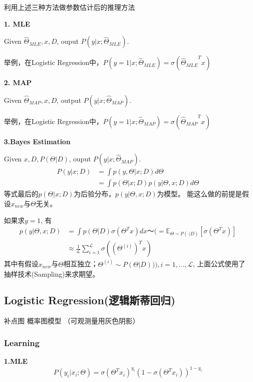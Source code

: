 \documentclass[UTF8]{ctexart}
\begin{document}
利用上述三种方法做参数估计后的推理方法


\textbf{1. MLE}

Given $\hat \Theta_{MLE}, x, D$, ouput $P(y | x; \hat \Theta_{MLE} )$.

举例，在Logistic Regression中，$P(y=1|x;\hat \Theta_{MLE} )=\sigma({\hat \Theta_{MLE} }^T x)$

\textbf{2. MAP}

Given $\hat \Theta_{MAP}, x, D$, output $P(y | x; \hat \Theta_{MAP} )$.

举例，在Logistic Regression中，$P(y=1|x;\hat \Theta_{MAP} )=\sigma({\hat \Theta_{MAP} }^T x)$

\textbf{3.Bayes Estimation}

Given $ x, D, P(\Theta|D)$, ouput $P(y | x; \hat \Theta_{MAP} )$.
\begin{equation*}
    \begin{aligned}
        P(y|x;D) &= \int p(y, \Theta | x;D) d\Theta    \\
        &= \int p(\Theta | x;D)p(y|\Theta,x;D)d\Theta
    \end{aligned}    
\end{equation*}
等式最后的$p(\Theta | x;D)$为后验分布，$p(y|\Theta,x;D)$为模型。
能这么做的前提是假设$x_{new}$与$\Theta$无关。

如果求$y=1$, 有
\begin{equation*}
    \begin{aligned}
        p(y|\Theta,x;D)&=\int p(\Theta|D)\sigma(\Theta^T x)dx ～ (= \mathbb{E}_{{\Theta} \sim P(\cdot |D)}[\sigma(\Theta^Tx)] \\
        &\approx \frac{1}{\mathcal{L}} \sum_{i=1}^{\mathcal{L}} \sigma((\Theta^{(i)})^Tx)
    \end{aligned}
\end{equation*}
其中有假设$x_{new}$与$\Theta$相互独立；$\Theta^{(i)} \sim P(\Theta |D))), i=1,...,\mathcal{L}$, 上面公式使用了抽样技术(Sampling)来求期望。

\subsection{Logistic Regression(逻辑斯蒂回归)}
补点图 概率图模型 （可观测量用灰色阴影）

\subsubsection*{\textbf{Learning}}

\textbf{1.MLE}
\begin{equation*}
    P(y_i|x_i;\Theta) = \sigma(\Theta^T x_i)^{y_i} (1-\sigma(\Theta^Tx_i))^{1-y_i}
\end{equation*}
\end{document}
